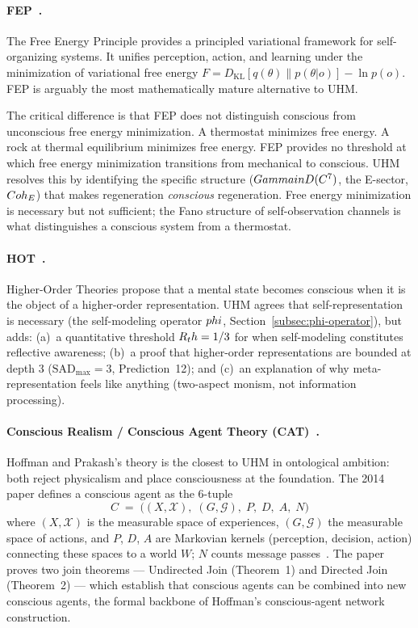 \paragraph{FEP~\cite{friston2019}.}
The Free Energy Principle provides a principled variational framework for self-organizing
systems. It unifies perception, action, and learning under the minimization of variational
free energy $F = D_{\mathrm{KL}}[q(\theta) \| p(\theta | o)] - \ln p(o)$. FEP is arguably
the most mathematically mature alternative to UHM.

The critical difference is that FEP does not distinguish conscious from unconscious free
energy minimization. A thermostat minimizes free energy. A rock at thermal equilibrium
minimizes free energy. FEP provides no threshold at which free energy minimization
transitions from mechanical to conscious. UHM resolves this by identifying the specific
structure ($Gamma in D(C^7)$, the E-sector, $Coh_E$) that makes
regeneration \emph{conscious} regeneration. Free energy minimization is necessary but
not sufficient; the Fano structure of self-observation channels is what distinguishes
a conscious system from a thermostat.

\paragraph{HOT~\cite{lau2011}.}
Higher-Order Theories propose that a mental state becomes conscious when it is the object
of a higher-order representation. UHM agrees that self-representation is necessary
(the self-modeling operator $phi$, Section~\ref{subsec:phi-operator}), but adds:
(a)~a quantitative threshold $R_th = 1/3$ for when self-modeling constitutes reflective
awareness; (b)~a proof that higher-order representations are bounded at depth 3
($\mathrm{SAD}_{\max} = 3$, Prediction~12); and (c)~an explanation of why
meta-representation feels like anything (two-aspect monism, not information processing).

\paragraph{Conscious Realism / Conscious Agent Theory (CAT)~\cite{hoffman2014}.}
Hoffman and Prakash's theory is the closest to UHM in ontological ambition:
both reject physicalism and place consciousness at the foundation. The 2014
paper defines a conscious agent as the 6-tuple
\begin{equation*}
  C \;=\; \bigl((X, \mathcal{X}),\; (G, \mathcal{G}),\; P,\; D,\; A,\; N\bigr)
\end{equation*}
where $(X, \mathcal{X})$ is the measurable space of experiences,
$(G, \mathcal{G})$ the measurable space of actions, and $P$, $D$, $A$ are
Markovian kernels (perception, decision, action) connecting these spaces to a
world $W$; $N$ counts message passes~\cite{hoffman2014}. The paper proves two
join theorems --- Undirected Join (Theorem~1) and Directed Join (Theorem~2)
--- which establish that conscious agents can be combined into new conscious
agents, the formal backbone of Hoffman's conscious-agent network construction.

